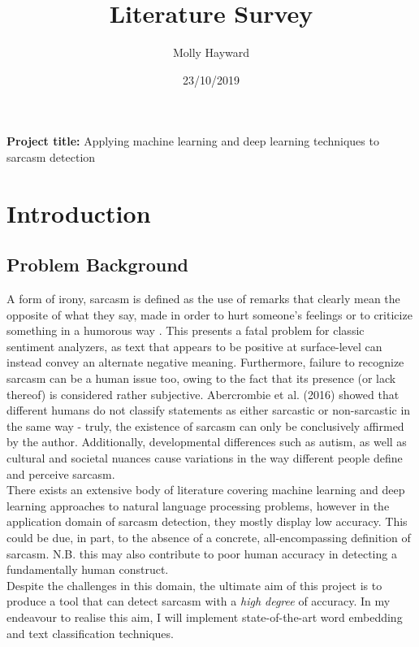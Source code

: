 \documentclass[12pt,a4paper]{article}
\title{Literature Survey}
\author{Molly Hayward}
\date{23/10/2019}
\begin{document}
\maketitle
\begin{center}
	\textbf{Project title:} Applying machine learning and deep learning techniques to sarcasm detection
\end{center}


\section{Introduction}
\subsection{Problem Background}
\noindent A form of irony, sarcasm is defined as the use of remarks that clearly mean the opposite of what they say, made in order to hurt someone's feelings or to criticize something in a humorous way \cite{cambridge2019}. This presents a fatal problem for classic sentiment analyzers, as text that appears to be positive at surface-level can instead convey an alternate negative meaning. Furthermore, failure to recognize sarcasm can be a human issue too, owing to the fact that its presence (or lack thereof) is considered rather subjective. Abercrombie et al. (2016) \cite{abercrombie2016putting} showed that different humans do not classify statements as either sarcastic or non-sarcastic in the same way - truly, the existence of sarcasm can only be conclusively affirmed by the author. Additionally, developmental differences such as autism, as well as cultural and societal nuances cause variations in the way different people define and perceive sarcasm. \\

\noindent There exists an extensive body of literature covering machine learning and deep learning approaches to natural language processing problems, however in the application domain of sarcasm detection, they mostly display low accuracy. This could be due, in part, to the absence of a concrete, all-encompassing definition of sarcasm. N.B. this may also contribute to poor human accuracy in detecting a fundamentally human construct. \\

\noindent Despite the challenges in this domain, the ultimate aim of this project is to produce a tool that can detect sarcasm with a \textit{high degree} of accuracy. In my endeavour to realise this aim, I will implement state-of-the-art word embedding and text classification techniques.
\end{document}
